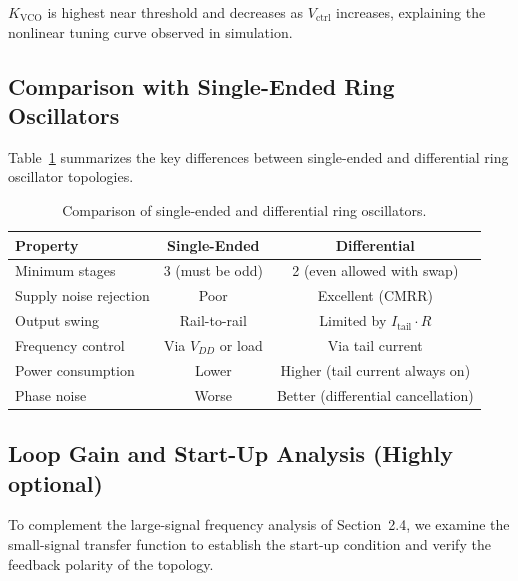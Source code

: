 \documentclass[11pt]{article}
\begin{document}
$K_{\text{VCO}}$ is highest near threshold and decreases as $V_{\text{ctrl}}$ increases,
explaining the nonlinear tuning curve observed in simulation.


\subsection{Comparison with Single-Ended Ring Oscillators}

Table~\ref{tab:comparison_ring_oscillators} summarizes the key differences between
single-ended and differential ring oscillator topologies.

\begin{table}[h]
    \centering
    \caption{Comparison of single-ended and differential ring oscillators.}
    \label{tab:comparison_ring_oscillators}
    \begin{tabular}{lcc}
        \hline
        \textbf{Property} & \textbf{Single-Ended} & \textbf{Differential} \\
        \hline
        Minimum stages & 3 (must be odd) & 2 (even allowed with swap) \\
        Supply noise rejection & Poor & Excellent (CMRR) \\
        Output swing & Rail-to-rail & Limited by $I_{\text{tail}} \cdot R$ \\
        Frequency control & Via $V_{DD}$ or load & Via tail current \\
        Power consumption & Lower & Higher (tail current always on) \\
        Phase noise & Worse & Better (differential cancellation) \\
        \hline
    \end{tabular}
\end{table}
\subsection{Loop Gain and Start-Up Analysis (Highly optional)}
 
To complement the large-signal frequency analysis of Section~2.4, we examine the
small-signal transfer function to establish the start-up condition and
verify the feedback polarity of the topology.
 
\end{document}
